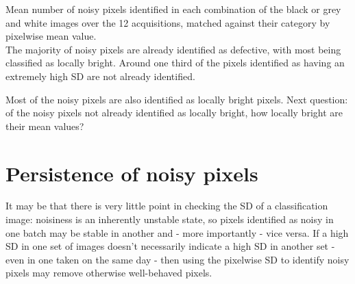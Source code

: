 \documentclass[10pt,fleqn]{article}
\begin{document}
\begin{table}[!ht] %
\begin{footnotesize}
\caption{Mean number of noisy pixels identified in each combination of the black or grey and white images over the 12 acquisitions, matched against their category by pixelwise mean value.\\ The majority of noisy pixels are already identified as defective, with most being classified as locally bright. Around one third of the pixels identified as having an extremely high SD are not already identified.}

\end{footnotesize}
\end{table}

Most of the noisy pixels are also identified as locally bright pixels. Next question: of the noisy pixels not already identified as locally bright, how locally bright are their mean values? 


\section{Persistence of noisy pixels}

It may be that there is very little point in checking the SD of a classification image: noisiness is an inherently unstable state, so pixels identified as noisy in one batch may be stable in another and - more importantly - vice versa. If a high SD in one set of images doesn't necessarily indicate a high SD in another set - even in one taken on the same day - then using the pixelwise SD to identify noisy pixels may remove otherwise well-behaved pixels.

\end{document}
